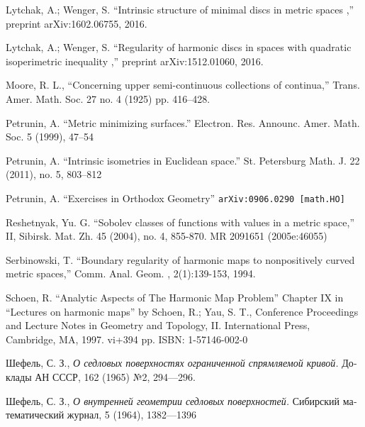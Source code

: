 \documentclass{article}
\begin{document}
\begin{thebibliography}{52}
Lytchak, A.; Wenger, S. ``Intrinsic structure of minimal discs in metric spaces ,'' preprint  arXiv:1602.06755, 2016.

Lytchak, A.; Wenger, S. ``Regularity of harmonic discs in spaces with quadratic isoperimetric inequality  ,'' preprint  arXiv:1512.01060, 2016.

Moore, R. L.,
``Concerning upper semi-continuous collections of continua,''
Trans. Amer. Math. Soc. 27 no. 4 (1925) pp. 416--428.

 Petrunin, A.
``Metric minimizing surfaces.''
Electron. Res. Announc. Amer. Math. Soc. 5 (1999), 47--54 

 Petrunin, A.
``Intrinsic isometries in Euclidean space.''
St. Petersburg Math. J. 22 (2011), no. 5, 803--812 

 Petrunin, A. 
``Exercises in Orthodox Geometry''
{\tt arXiv:0906.0290 [math.HO]}

Reshetnyak, Yu. G. ``Sobolev classes of functions with values in a metric space,'' II, Sibirsk. Mat. Zh. 45 (2004), no. 4, 855-870. MR 2091651 (2005e:46055)

 Serbinowski,  T. ``Boundary regularity of harmonic maps to nonpositively curved metric spaces,''
Comm. Anal. Geom. , 2(1):139-153, 1994.

Schoen, R. ``Analytic Aspects of The Harmonic Map Problem'' Chapter IX in  
``Lectures on harmonic maps'' by Schoen, R.; Yau, S. T.,  
Conference Proceedings and Lecture Notes in Geometry and Topology, II. International Press, Cambridge, MA, 1997. vi+394 pp. ISBN: 1-57146-002-0

\begin{otherlanguage}{russian}
Шефель, С. З.,
\textit{О седловых поверхностях ограниченной спрямляемой кривой.}
Доклады АН СССР, 162 (1965) №2, 
294---296.
\end{otherlanguage}

\begin{otherlanguage}{russian}
Шефель, С. З., 
\textit{О внутренней геометрии седловых поверхностей.}
Сибирский математический журнал, 5 (1964), 1382---1396
\end{otherlanguage}


\end{thebibliography}
\end{document}
